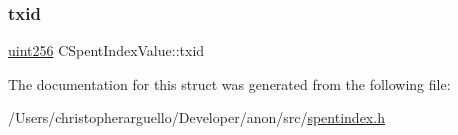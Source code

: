 \mbox{\label{struct_c_spent_index_value_aad16faff9e2d74359d977986911bac33}} 
\subsubsection{\texorpdfstring{txid}{txid}}
{\footnotesize\ttfamily \mbox{\hyperlink{classuint256}{uint256}} C\+Spent\+Index\+Value\+::txid}



The documentation for this struct was generated from the following file\+:\begin{DoxyCompactItemize}
\item 
/\+Users/christopherarguello/\+Developer/anon/src/\mbox{\hyperlink{spentindex_8h}{spentindex.\+h}}\end{DoxyCompactItemize}
